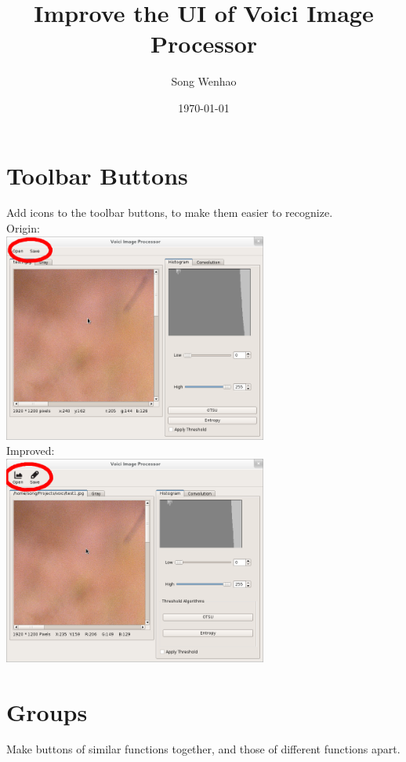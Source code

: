 \documentclass[10pt,a4paper]{article}
\begin{document}
\title{Improve the UI of Voici Image Processor}
\author{Song Wenhao}
\date{\today}
\maketitle
\section{Toolbar Buttons}
Add icons to the toolbar buttons, to make them easier to recognize.\\

Origin:\\
\indent\includegraphics[width=0.65\textwidth]{icon_origin.png}\\

Improved:\\
\indent\includegraphics[width=0.65\textwidth]{icon_improved.png}

\pagebreak


\section{Groups}
Make buttons of similar functions together, and those of different functions apart.\\
\end{document}
